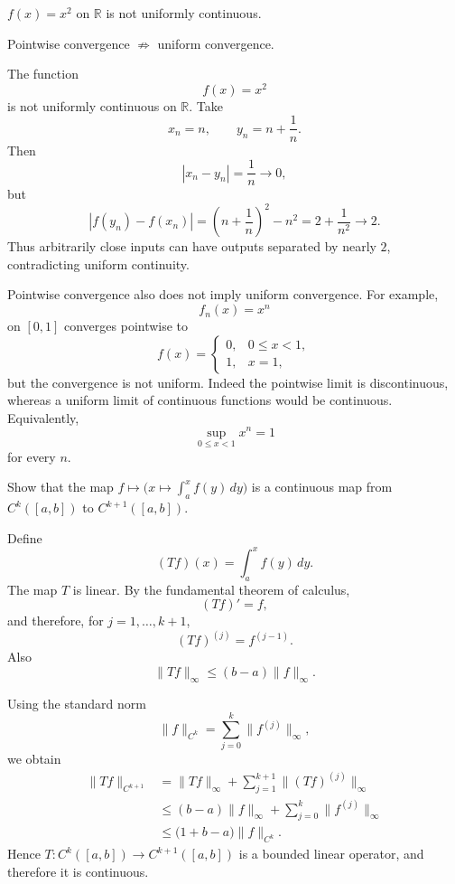 \begin{problem}[CP-IV-0032]
\label{prob:cp-iv-0032}
$f(x)=x^2$ on $\mathbb{R}$ is not uniformly continuous.
	\par\noindent\textbullet\quad Pointwise convergence $\nRightarrow$ uniform convergence.
\end{problem}

\begin{solution}
The function
\[
f(x)=x^2
\]
is not uniformly continuous on \(\mathbb R\). Take
\[
x_n=n,
\qquad
y_n=n+\frac1n.
\]
Then
\[
|x_n-y_n|=\frac1n\longrightarrow0,
\]
but
\[
|f(y_n)-f(x_n)|
=
\left(n+\frac1n\right)^2-n^2
=
2+\frac1{n^2}
\longrightarrow2.
\]
Thus arbitrarily close inputs can have outputs separated by nearly \(2\), contradicting uniform continuity.

Pointwise convergence also does not imply uniform convergence. For example,
\[
f_n(x)=x^n
\]
on \([0,1]\) converges pointwise to
\[
f(x)=
\begin{cases}
0,&0\le x<1,\\
1,&x=1,
\end{cases}
\]
but the convergence is not uniform. Indeed the pointwise limit is discontinuous, whereas a uniform limit of continuous functions would be continuous. Equivalently,
\[
\sup_{0\le x<1}x^n=1
\]
for every \(n\).
\end{solution}


\begin{problem}[CP-IV-0033]
\label{prob:cp-iv-0033}
\par\noindent\textbullet\quad Show that the map $f \mapsto \displaystyle\Big(x\mapsto \int_a^x f(y)\,dy\Big)$ is a continuous map from $C^k([a,b])$ to $C^{k+1}([a,b])$.
\end{problem}

\begin{solution}
Define
\[
(Tf)(x)=\int_a^x f(y)\,dy.
\]
The map \(T\) is linear. By the fundamental theorem of calculus,
\[
(Tf)'=f,
\]
and therefore, for \(j=1,\ldots,k+1\),
\[
(Tf)^{(j)}=f^{(j-1)}.
\]
Also
\[
\|Tf\|_\infty
\le
(b-a)\|f\|_\infty.
\]

Using the standard norm
\[
\|f\|_{C^k}
=
\sum_{j=0}^k\|f^{(j)}\|_\infty,
\]
we obtain
\[
\begin{aligned}
\|Tf\|_{C^{k+1}}
&=
\|Tf\|_\infty
+
\sum_{j=1}^{k+1}\|(Tf)^{(j)}\|_\infty\\
&\le
(b-a)\|f\|_\infty
+
\sum_{j=0}^k\|f^{(j)}\|_\infty\\
&\le
\bigl(1+b-a\bigr)\|f\|_{C^k}.
\end{aligned}
\]
Hence \(T:C^k([a,b])\to C^{k+1}([a,b])\) is a bounded linear operator, and therefore it is continuous.
\end{solution}


